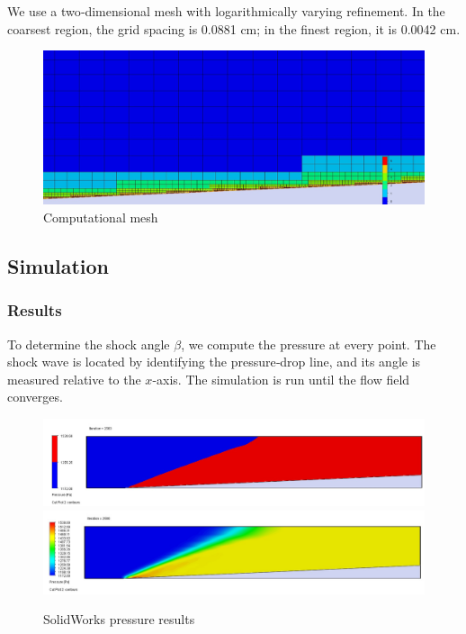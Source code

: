 We use a two‐dimensional mesh with logarithmically varying refinement. In the coarsest region, the grid spacing is 0.0881 cm; in the finest region, it is 0.0042 cm.
\begin{figure}[H]
    \centering
    \includegraphics[width=0.8\linewidth]{ressources/images/CFD/Maillage.jpg}
    \caption{Computational mesh}
    \label{fig:mesh}
\end{figure}

\subsection{Simulation}

\subsubsection{Results}

To determine the shock angle \(\beta\), we compute the pressure at every point. The shock wave is located by identifying the pressure‐drop line, and its angle is measured relative to the \(x\)-axis. The simulation is run until the flow field converges.

\begin{figure}[H]
    \centering
    \includegraphics[width=0.8\linewidth]{ressources/images/CFD/SolidWorks1.jpg}
    \includegraphics[width=0.8\linewidth]{ressources/images/CFD/SolidWorks2.jpg}
    \caption{SolidWorks pressure results}
    \label{fig:resSW}
\end{figure}

